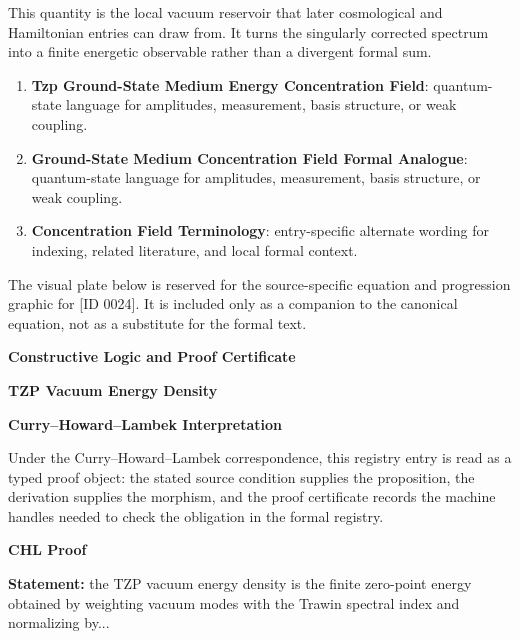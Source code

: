 This quantity is the local vacuum reservoir that later cosmological and Hamiltonian entries can draw from. It turns the singularly corrected spectrum into a finite energetic observable rather than a divergent formal sum.
\endgroup

\begingroup\footnotesize\sloppy
\begin{enumerate}[leftmargin=1.35em,itemsep=1pt,topsep=1pt,parsep=0pt]
\item \textbf{Tzp Ground-State Medium Energy Concentration Field}: quantum-state language for amplitudes, measurement, basis structure, or weak coupling.
\item \textbf{Ground-State Medium Concentration Field Formal Analogue}: quantum-state language for amplitudes, measurement, basis structure, or weak coupling.
\item \textbf{Concentration Field Terminology}: entry-specific alternate wording for indexing, related literature, and local formal context.
\end{enumerate}
\endgroup

\begingroup\footnotesize\sloppy
The visual plate below is reserved for the source-specific equation and progression graphic for [ID 0024]. It is included only as a companion to the canonical equation, not as a substitute for the formal text.
\par\endgroup
\ifTZPDarkEdition
{}
\fi

\clearpage
\begingroup\tzpsupportsetup
\noindent\textbf{\fontsize{10.8pt}{12.8pt}\selectfont [ID 0024] Constructive Logic and Proof Certificate}\par
\noindent\textbf{\fontsize{10pt}{12pt}\selectfont TZP Vacuum Energy Density}\par
\vspace{0.45em}
\begingroup
\footnotesize
\setlength{\parskip}{0.22em}
\setlength{\parindent}{0pt}
\noindent\textbf{Curry--Howard--Lambek Interpretation}\par
Under the Curry--Howard--Lambek correspondence, this registry entry is read as a typed proof
object: the stated source condition supplies the proposition, the derivation supplies the
morphism, and the proof certificate records the machine handles needed to check the obligation
in the formal registry.

\vspace{0.45em}
\noindent\textbf{CHL Proof}\par
\textbf{Statement:} the TZP vacuum energy density is the finite zero-point energy obtained by weighting
vacuum modes with the Trawin spectral index and normalizing by...


